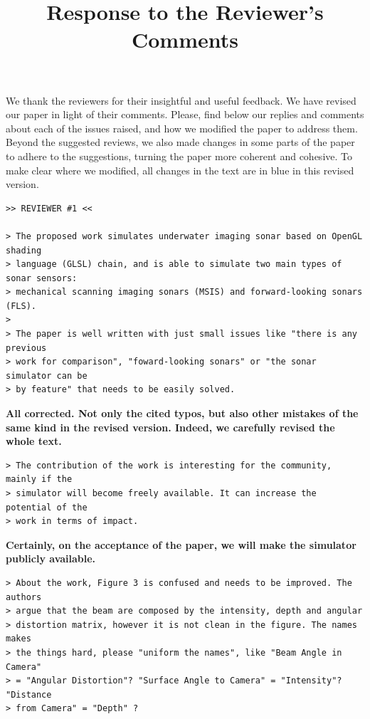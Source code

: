\documentclass{article}
\title{Response to the Reviewer's Comments}
\begin{document}
\maketitle

We thank the reviewers for their insightful and useful feedback. We have revised our paper in light of their comments. Please, find below our replies and comments about each of the issues raised, and how we modified the paper to address them. Beyond the suggested reviews, we also made changes in some parts of the paper to adhere to the suggestions, turning the paper more coherent and cohesive. To make clear where we modified, all changes in the text are in blue in this revised version.

\begin{verbatim}
>> REVIEWER #1 <<

> The proposed work simulates underwater imaging sonar based on OpenGL shading
> language (GLSL) chain, and is able to simulate two main types of sonar sensors:
> mechanical scanning imaging sonars (MSIS) and forward-looking sonars (FLS).
>
> The paper is well written with just small issues like "there is any previous
> work for comparison", "foward-looking sonars" or "the sonar simulator can be
> by feature" that needs to be easily solved.
\end{verbatim}

\textbf{All corrected. Not only the cited typos, but also other
mistakes of the same kind in the revised version. Indeed, we carefully revised the whole text.}

\begin{verbatim}
> The contribution of the work is interesting for the community, mainly if the 
> simulator will become freely available. It can increase the potential of the
> work in terms of impact.
\end{verbatim}

\textbf{Certainly, on the acceptance of the paper, we will make the simulator publicly available.}

\begin{verbatim}
> About the work, Figure 3 is confused and needs to be improved. The authors
> argue that the beam are composed by the intensity, depth and angular
> distortion matrix, however it is not clean in the figure. The names makes
> the things hard, please "uniform the names", like "Beam Angle in Camera"
> = "Angular Distortion"? "Surface Angle to Camera" = "Intensity"? "Distance
> from Camera" = "Depth" ?
\end{verbatim}
\end{document}
